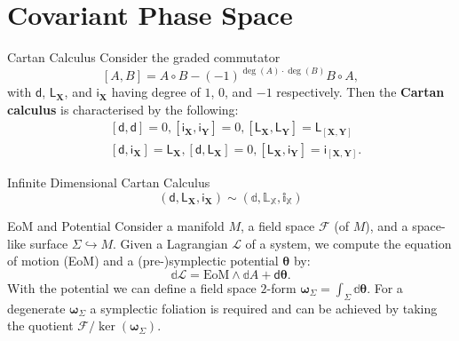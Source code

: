 \documentclass{beamer}
\begin{document}
\section{Covariant Phase Space}
\begin{frame}{}
  \begin{block}{Cartan Calculus}
    Consider the graded commutator
    \begin{equation}
      \left[ A, B \right] = A \circ B - (-1) ^{\deg(A) \cdot \deg(B)} B \circ A,
    \end{equation}
    with \(\mathsf{d}\), \(\mathsf{L}_ {\boldsymbol{X}}\), and \(\mathsf{i} _{\boldsymbol{X}}\) having degree of \(1\), \(0\), and \(-1\) respectively.
    Then the \textbf{Cartan calculus} is characterised by the following:
    \begin{equation}
      \begin{split}
        &\left[ \mathsf{d}, \mathsf{d} \right] = 0, \left[ \mathsf{i} _{\boldsymbol{X}}, \mathsf{i} _{\boldsymbol{Y}} \right] = 0, \left[ \mathsf{L}_ {\boldsymbol{X}}, \mathsf{L}_ {\boldsymbol{Y}} \right] = \mathsf{L}_ {\left[ \boldsymbol{X}, \boldsymbol{Y} \right]}\\
        &\left[ \mathsf{d}, \mathsf{i} _{\boldsymbol{X}} \right] = \mathsf{L}_ {\boldsymbol{X}}, \left[ \mathsf{d}, \mathsf{L}_ {\boldsymbol{X}} \right] = 0, \left[ \mathsf{L}_ {\boldsymbol{X}}, \mathsf{i} _{\boldsymbol{Y}} \right] = \mathsf{i} _{\left[ \boldsymbol{X}, \boldsymbol{Y} \right]}.
      \end{split}
    \end{equation}
  \end{block}
  \begin{block}{Infinite Dimensional Cartan Calculus}
    \begin{equation}
      (\mathsf{d}, \mathsf{L}_ {\boldsymbol{X}}, \mathsf{i} _{\boldsymbol{X}}) \sim (\mathbb{d}, \mathbb{L}_ {\mathbb{X}}, \mathbb{i} _{\mathbb{X}})
    \end{equation}
  \end{block}
\end{frame}

\begin{frame}{}
  \begin{block}{EoM and Potential}
    Consider a manifold \(M\), a field space \(\mathcal{F}\) (of \(M\)), and a space-like surface \(\Sigma \hookrightarrow M\). Given a Lagrangian \(\mathcal{L}\) of a system, we compute the equation of motion (EoM) and a (pre-)symplectic potential \(\boldsymbol{\theta}\) by:
    \begin{equation}
      \mathbb{d} \mathcal{L} = \mbox{EoM} \wedge \mathbb{d} A + \mathsf{d} \boldsymbol{\theta}.
    \end{equation}
    With the potential we can define a field space \(2\)-form \(\boldsymbol{\omega} _{\Sigma} = \int _{\Sigma} \mathbb{d} \boldsymbol{\theta}\). For a degenerate \(\boldsymbol{\omega} _{\Sigma}\) a symplectic foliation is required and can be achieved by taking the quotient \(\mathcal{F}/ \ker(\boldsymbol{\omega} _{\Sigma})\).
  \end{block}
\end{frame}

\end{document}
